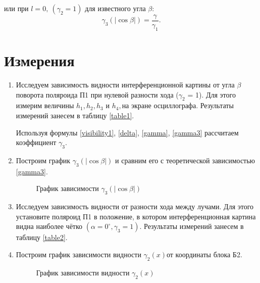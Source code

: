 \documentclass{MagicLabs}
\begin{document}
или при $ l = 0,~(\gamma_2 = 1) $ для известного угла $ \beta $:
\begin{equation}\label{gamma3}
	\gamma_3(|\cos\beta|) = \dfrac{\gamma}{\gamma_1}.
\end{equation}

\section{Измерения}

\begin{enumerate}
	\setcounter{enumi}{0}
	
	\item Исследуем зависимость видности интерференционной картины от угла $ \beta $
	поворота поляроида П1 при нулевой разности хода ($ \gamma_2 $ = 1). Для этого измерим
	величины $ h_1, h_2, h_3 $ и $ h_4, $на экране осциллографа. Результаты измерений занесем
	в таблицу \ref{table1}.
	
	Используя формулы \eqref{visibility1}, \eqref{delta}, \eqref{gamma}, \eqref{gamma3} 
	рассчитаем коэффициент $ \gamma_3 $.

\begin{table}[!h]\centering
	
\end{table}

\item Построим график $ \gamma_3(|\cos\beta|) $ и сравним его с теоретической зависимостью \eqref{gamma3}.

  
\begin{figure}[h!]\centering
	\vspace{-1ex}
	
	\caption{График зависимости $ \gamma_3(|\cos\beta|) $}
\end{figure}

\item Исследуем зависимость видности от разности хода между лучами. Для этого установите поляроид П1 в положение, в котором интерференционная картина видна наиболее чётко 
$ (\alpha=0^\circ, \gamma_3 = 1) $. Результаты измерений занесем
в таблицу \ref{table2}.

\begin{table}[!h]\centering
	
\end{table}

\item Построим график зависимости видности $ \gamma_2(x)  $от координаты блока Б2.
\newpage

\begin{figure}[h!]\centering
	
	\caption{ График зависимости видности $ \gamma_2(x)  $}
\end{figure}

\end{enumerate}
\end{document}
